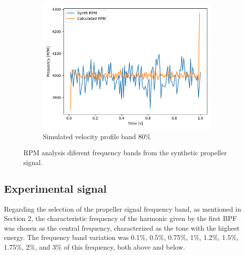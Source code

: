 \documentclass[10pt,fleqn,a4paper,twoside]{article}
\begin{document}
\begin{figure}[H]
\begin{subfigure}{0.4\textwidth}
        \includegraphics[width=\textwidth]{Figures/rpm_analysis_band_80.png}
        \caption{Simulated velocity profile band 80\%}
        \label{fig:sixth}
    \end{subfigure}   
    \caption{RPM analysis diferent frequency bands from the synthetic propeller signal.}
    \label{fig:figures}
    \end{figure}



\subsection{Experimental signal}
Regarding the selection of the propeller signal frequency band, as mentioned in Section 2, the characteristic frequency of the harmonic given by the first BPF was chosen as the central frequency, characterized as the tone with the highest energy. The frequency band variation was 0.1\%, 0.5\%, 0.75\%, 1\%, 1.2\%, 1.5\%, 1.75\%, 2\%, and 3\% of this frequency, both above and below. 
\end{document}
